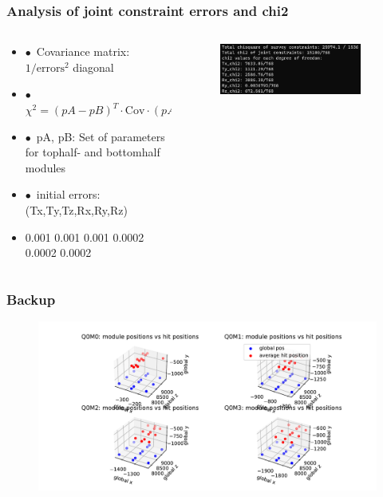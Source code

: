 \documentclass[aspectratio=1610, 12pt]{beamer}
\begin{document}
\begin{frame}\frametitle{Analysis of joint constraint errors and chi2}
  \begin{columns}
    \begin{column}[c]{0.5\textwidth}
      \begin{itemize}
        \item $\bullet$\, Covariance matrix: $1 / \text{errors}^2$ diagonal
        \item $\bullet$\, $\chi^2 = (pA - pB)^{T} \cdot \text{Cov} \cdot (pA - pB)$
        \item $\bullet$\, pA, pB: Set of parameters for tophalf- and bottomhalf modules
        \item $\bullet$\, initial errors: (Tx,Ty,Tz,Rx,Ry,Rz)
        \item 0.001 0.001 0.001 0.0002 0.0002 0.0002
      \end{itemize}
    \end{column}
    \begin{column}[c]{0.48\textwidth}
      \begin{figure}
        \includegraphics[width=0.9\textwidth]{plots/jointChi2_baseErrors.png}
      \end{figure}
    \end{column}
  \end{columns}
\end{frame}

\begin{frame}\frametitle{Backup}
  \begin{figure}
    \includegraphics[width=\textwidth]{plots/bad_module_Q0M0.pdf}
  \end{figure}
\end{frame}
\end{document}
